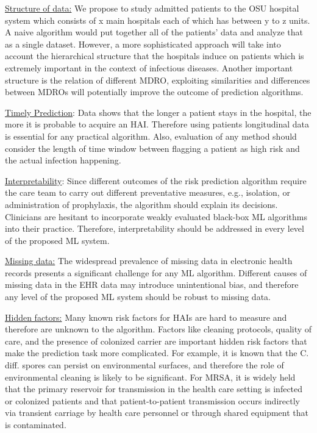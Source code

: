 \underline{Structure of data:} We propose to study admitted patients to the OSU hospital system which consists of x main hospitals each of which has between y to z units. A naive algorithm would put together all of the patients' data and analyze that as a single dataset. However, a more sophisticated approach will take into account the hierarchical structure that the hospitals induce on patients which is extremely important in the context of infectious diseases. Another important structure is the relation of different MDRO, exploiting similarities and differences between MDROs will potentially improve the outcome of prediction algorithms.

\underline{Timely Prediction}: Data shows that the longer a patient stays in the hospital, the more it is probable to acquire an HAI. Therefore using patients longitudinal data is essential for any practical algorithm. Also, evaluation of any method should consider the length of time window between flagging a patient as high risk and the actual infection happening.

\underline{Interpretability}: Since different outcomes of the risk prediction algorithm require the care team to carry out different preventative measures, e.g., isolation, or administration of prophylaxis, the algorithm should explain its decisions. Clinicians are hesitant to incorporate weakly evaluated black-box ML algorithms into their practice. Therefore, interpretability should be addressed in every level of the proposed ML system.

\underline{Missing data:}  The widespread prevalence of missing data in electronic health records presents a significant challenge for any ML algorithm. Different causes of missing data in the EHR data may introduce unintentional bias, and therefore any level of the proposed ML system should be robust to missing data.

\underline{Hidden factors:} Many known risk factors for HAIs are hard to measure and therefore are unknown to the algorithm. Factors like cleaning protocols, quality of care, and the presence of colonized carrier are important hidden risk factors that make the prediction task more complicated.  For example, it is known that the C. diff. spores can persist on environmental surfaces, and therefore the role of environmental cleaning is likely to be significant. For MRSA, it is widely held that the primary reservoir for transmission in the health care setting is infected or colonized patients and that patient-to-patient transmission occurs indirectly via transient carriage by health care personnel or through shared equipment that is contaminated.


